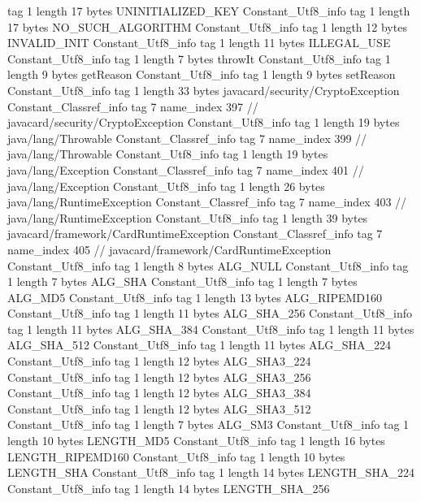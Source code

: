 {{{			tag	1
			length	17
			bytes	UNINITIALIZED_KEY
		}
		Constant_Utf8_info {
			tag	1
			length	17
			bytes	NO_SUCH_ALGORITHM
		}
		Constant_Utf8_info {
			tag	1
			length	12
			bytes	INVALID_INIT
		}
		Constant_Utf8_info {
			tag	1
			length	11
			bytes	ILLEGAL_USE
		}
		Constant_Utf8_info {
			tag	1
			length	7
			bytes	throwIt
		}
		Constant_Utf8_info {
			tag	1
			length	9
			bytes	getReason
		}
		Constant_Utf8_info {
			tag	1
			length	9
			bytes	setReason
		}
		Constant_Utf8_info {
			tag	1
			length	33
			bytes	javacard/security/CryptoException
		}
		Constant_Classref_info {
			tag	7
			name_index	397		// javacard/security/CryptoException
		}
		Constant_Utf8_info {
			tag	1
			length	19
			bytes	java/lang/Throwable
		}
		Constant_Classref_info {
			tag	7
			name_index	399		// java/lang/Throwable
		}
		Constant_Utf8_info {
			tag	1
			length	19
			bytes	java/lang/Exception
		}
		Constant_Classref_info {
			tag	7
			name_index	401		// java/lang/Exception
		}
		Constant_Utf8_info {
			tag	1
			length	26
			bytes	java/lang/RuntimeException
		}
		Constant_Classref_info {
			tag	7
			name_index	403		// java/lang/RuntimeException
		}
		Constant_Utf8_info {
			tag	1
			length	39
			bytes	javacard/framework/CardRuntimeException
		}
		Constant_Classref_info {
			tag	7
			name_index	405		// javacard/framework/CardRuntimeException
		}
		Constant_Utf8_info {
			tag	1
			length	8
			bytes	ALG_NULL
		}
		Constant_Utf8_info {
			tag	1
			length	7
			bytes	ALG_SHA
		}
		Constant_Utf8_info {
			tag	1
			length	7
			bytes	ALG_MD5
		}
		Constant_Utf8_info {
			tag	1
			length	13
			bytes	ALG_RIPEMD160
		}
		Constant_Utf8_info {
			tag	1
			length	11
			bytes	ALG_SHA_256
		}
		Constant_Utf8_info {
			tag	1
			length	11
			bytes	ALG_SHA_384
		}
		Constant_Utf8_info {
			tag	1
			length	11
			bytes	ALG_SHA_512
		}
		Constant_Utf8_info {
			tag	1
			length	11
			bytes	ALG_SHA_224
		}
		Constant_Utf8_info {
			tag	1
			length	12
			bytes	ALG_SHA3_224
		}
		Constant_Utf8_info {
			tag	1
			length	12
			bytes	ALG_SHA3_256
		}
		Constant_Utf8_info {
			tag	1
			length	12
			bytes	ALG_SHA3_384
		}
		Constant_Utf8_info {
			tag	1
			length	12
			bytes	ALG_SHA3_512
		}
		Constant_Utf8_info {
			tag	1
			length	7
			bytes	ALG_SM3
		}
		Constant_Utf8_info {
			tag	1
			length	10
			bytes	LENGTH_MD5
		}
		Constant_Utf8_info {
			tag	1
			length	16
			bytes	LENGTH_RIPEMD160
		}
		Constant_Utf8_info {
			tag	1
			length	10
			bytes	LENGTH_SHA
		}
		Constant_Utf8_info {
			tag	1
			length	14
			bytes	LENGTH_SHA_224
		}
		Constant_Utf8_info {
			tag	1
			length	14
			bytes	LENGTH_SHA_256
}}}
